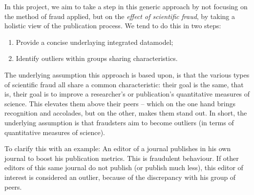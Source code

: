 \documentclass{ou-report}
\newcommand{\todo}[1]{{\color{red} TODO: #1}}
\begin{document}
In this project, we aim to take a step in this generic approach by not 
focusing on the method of fraud applied, but on the 
\emph{effect of scientific fraud}, by taking a holistic view of the publication 
process. We tend to do this in two steps:
\begin{enumerate}
\item Provide a concise underlaying integrated datamodel;
\item Identify outliers within groups sharing characteristics.
\end{enumerate}

The underlying assumption this approach is based upon, is that the various types 
of scientific fraud all 
share a common characteristic: their goal is the same, that is, their goal 
is to improve a researcher's or publication's quantitative measures of 
science. This elevates them above their peers -- which on the one hand 
brings recognition and accolades, but on the other, makes them stand out. In 
short, the underlying assumption is that fraudsters aim to become outliers 
(in terms of quantitative measures of science).

To clarify this with an example: An editor of a journal publishes in his 
own journal to boost his publication metrics. This is fraudulent behaviour. 
If other editors of this same journal do not publish (or publish much less), 
this editor of interest is considered an outlier, because of the discrepancy 
with his group of peers. 
\end{document}
